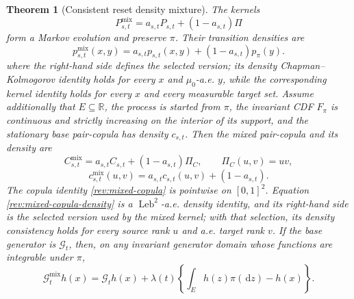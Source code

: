 \documentclass[11pt]{article}
\newtheorem{theorem}[definition]{Theorem}
\theoremstyle{remark}
\newcommand{\R}{\mathbb R}
\newcommand{\dd}{\,\mathrm d}
\newcommand{\Leb}{\operatorname{Leb}}
\begin{document}
\begin{theorem}[Consistent reset density mixture]
\label{rev:thm-mixed-kernel}
The kernels
\begin{equation}
P^{\mathrm{mix}}_{s,t}
=a_{s,t}P_{s,t}+(1-a_{s,t})\Pi
\label{rev:mixed-kernel}
\end{equation}
form a Markov evolution and preserve $\pi$.  Their transition densities are
\begin{equation}
p^{\mathrm{mix}}_{s,t}(x,y)
=a_{s,t}p_{s,t}(x,y)+(1-a_{s,t})p_\pi(y).
\label{rev:mixed-transition-density}
\end{equation}
where the right-hand side defines the selected version; its density
Chapman--Kolmogorov identity holds for every $x$ and $\mu_0$-a.e. $y$, while
the corresponding kernel identity holds for every $x$ and every measurable
target set.
Assume additionally that $E\subseteq\R$, the process is started from $\pi$,
the invariant CDF $F_\pi$ is continuous and strictly increasing on the
interior of its support, and the stationary base pair-copula has density
$c_{s,t}$.  Then the mixed pair-copula and its density are
\begin{equation}
C^{\mathrm{mix}}_{s,t}
=a_{s,t}C_{s,t}+(1-a_{s,t})\Pi_C,
\qquad \Pi_C(u,v)=uv,
\label{rev:mixed-copula}
\end{equation}
\begin{equation}
c^{\mathrm{mix}}_{s,t}(u,v)
=a_{s,t}c_{s,t}(u,v)+(1-a_{s,t}).
\label{rev:mixed-copula-density}
\end{equation}
The copula identity \eqref{rev:mixed-copula} is pointwise on $[0,1]^2$.
Equation \eqref{rev:mixed-copula-density} is a $\Leb^2$-a.e. density identity,
and its right-hand side is the selected version used by the mixed kernel; with
that selection, its density consistency holds for every source rank $u$ and
a.e. target rank $v$.
If the base generator is $\mathcal G_t$, then, on any invariant generator
domain whose functions are integrable under $\pi$,
\begin{equation}
\mathcal G_t^{\mathrm{mix}}h(x)
=\mathcal G_th(x)+\lambda(t)
\left\{\int_Eh(z)\pi(\dd z)-h(x)\right\}.
\label{rev:mixed-generator}
\end{equation}
\end{theorem}
\end{document}
